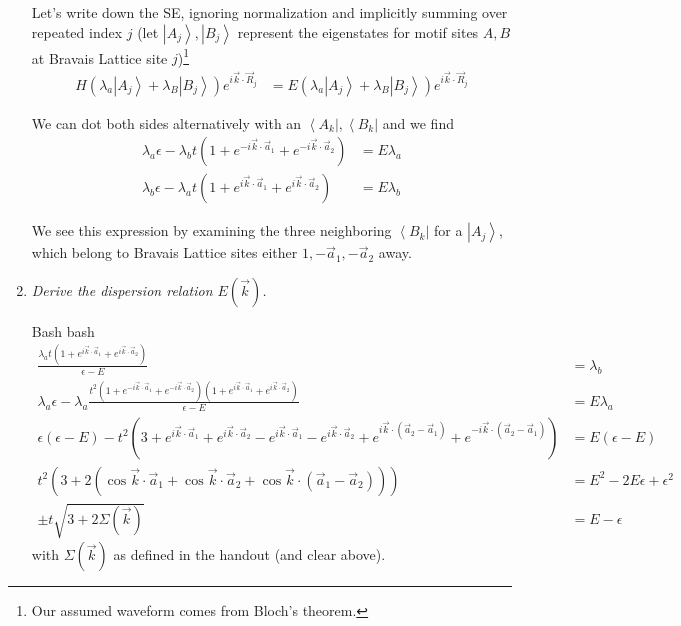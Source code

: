 \documentclass[10pt]{report}
\newcommand{\bra}[1]{\left<#1\right|}
\newcommand{\ket}[1]{\left|#1\right>}
\begin{document}
\begin{enumerate}[1.]
        Let's write down the SE, ignoring normalization and implicitly summing over repeated index $j$ (let $\ket{A_j}, \ket{B_j}$ represent the eigenstates for motif sites $A,B$ at Bravais Lattice site $j$)\footnote{Our assumed waveform comes from Bloch's theorem.}
        \begin{align}
            H(\lambda_a \ket{A_j} + \lambda_B \ket{B_j}) e^{i\vec{k} \cdot \vec{R}_j} &= E(\lambda_a \ket{A_j} + \lambda_B \ket{B_j}) e^{i\vec{k} \cdot \vec{R}_j}        
        \end{align}

        We can dot both sides alternatively with an $\bra{A_k}, \bra{B_k}$ and we find
        \begin{align}
            \lambda_a \epsilon - \lambda_bt\left( 1 + e^{-i\vec{k} \cdot \vec{a}_1} + e^{-i\vec{k} \cdot \vec{a}_2} \right) &= E\lambda_a\\
            \lambda_b \epsilon - \lambda_at\left( 1 + e^{i\vec{k} \cdot \vec{a}_1} + e^{i\vec{k} \cdot \vec{a}_2} \right) &= E\lambda_b
        \end{align}

        We see this expression by examining the three neighboring $\bra{B_k}$ for a $\ket{A_j}$, which belong to Bravais Lattice sites either $1, -\vec{a}_1, -\vec{a}_2$ away.

    \item \emph{Derive the dispersion relation $E(\vec{k})$.}

        Bash bash
        \begin{align}
            \frac{\lambda_at\left( 1 + e^{i\vec{k} \cdot \vec{a}_1} + e^{i\vec{k} \cdot \vec{a}_2} \right)}{\epsilon - E} &= \lambda_b\\
            \lambda_a \epsilon - \lambda_a\frac{t^2\left( 1 + e^{-i\vec{k} \cdot \vec{a}_1} + e^{-i\vec{k} \cdot \vec{a}_2} \right)\left( 1 + e^{i\vec{k} \cdot \vec{a}_1} + e^{i\vec{k} \cdot \vec{a}_2} \right)}{\epsilon - E} &= E\lambda_a\\
            \epsilon(\epsilon - E) -  t^2\left( 3 + e^{i\vec{k} \cdot \vec{a}_1} + e^{i\vec{k} \cdot \vec{a}_2} - e^{i\vec{k} \cdot \vec{a}_1} - e^{i\vec{k} \cdot \vec{a}_2} + e^{i\vec{k} \cdot \left( \vec{a}_2 - \vec{a}_1 \right)} + e^{-i\vec{k} \cdot \left( \vec{a}_2 - \vec{a}_1 \right)}\right) &= E(\epsilon - E)\\
            t^2\left( 3 + 2\left( \cos \vec{k} \cdot \vec{a}_1  + \cos \vec{k} \cdot \vec{a}_2 + \cos \vec{k} \cdot \left( \vec{a}_1 - \vec{a}_2 \right)\right)\right) &= E^2 - 2E\epsilon + \epsilon^2\\
            \pm t\sqrt{3 + 2\Sigma(\vec{k})} &= E - \epsilon
        \end{align}
        with $\Sigma(\vec{k})$ as defined in the handout (and clear above). 


\end{enumerate}
\end{document}

